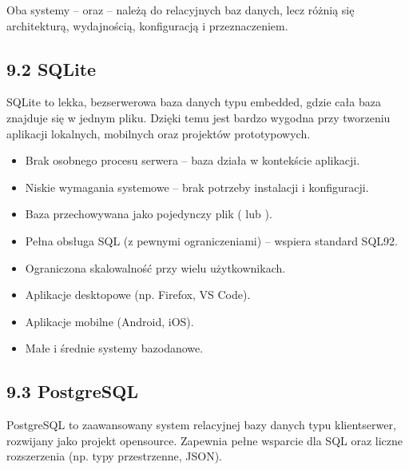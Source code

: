 \documentclass[a4paper,11pt,polish]{sphinxmanual}
\begin{document}
\sphinxAtStartPar
Oba systemy –  oraz  – należą do relacyjnych baz danych, lecz różnią się architekturą, wydajnością, konfiguracją i przeznaczeniem.


\subsection{9.2 SQLite}
\label{\detokenize{Konfiguracja_baz_danych/Konfiguracja_baz_danych:sqlite}}
\sphinxAtStartPar
SQLite to lekka, bezserwerowa baza danych typu embedded, gdzie cała baza znajduje się w jednym pliku. Dzięki temu jest bardzo wygodna przy tworzeniu aplikacji lokalnych, mobilnych oraz projektów prototypowych.

\sphinxAtStartPar
{}
\begin{itemize}
\item {} 
\sphinxAtStartPar
Brak osobnego procesu serwera – baza działa w kontekście aplikacji.

\item {} 
\sphinxAtStartPar
Niskie wymagania systemowe – brak potrzeby instalacji i konfiguracji.

\item {} 
\sphinxAtStartPar
Baza przechowywana jako pojedynczy plik ( lub ).

\item {} 
\sphinxAtStartPar
Pełna obsługa SQL (z pewnymi ograniczeniami) – wspiera standard SQL\sphinxhyphen{}92.

\item {} 
\sphinxAtStartPar
Ograniczona skalowalność przy wielu użytkownikach.

\end{itemize}

\sphinxAtStartPar
{}
\begin{itemize}
\item {} 
\sphinxAtStartPar
Aplikacje desktopowe (np. Firefox, VS Code).

\item {} 
\sphinxAtStartPar
Aplikacje mobilne (Android, iOS).

\item {} 
\sphinxAtStartPar
Małe i średnie systemy bazodanowe.

\end{itemize}


\subsection{9.3 PostgreSQL}
\label{\detokenize{Konfiguracja_baz_danych/Konfiguracja_baz_danych:postgresql}}
\sphinxAtStartPar
PostgreSQL to zaawansowany system relacyjnej bazy danych typu klient\sphinxhyphen{}serwer, rozwijany jako projekt open\sphinxhyphen{}source. Zapewnia pełne wsparcie dla SQL oraz liczne rozszerzenia (np. typy przestrzenne, JSON).
\end{document}

